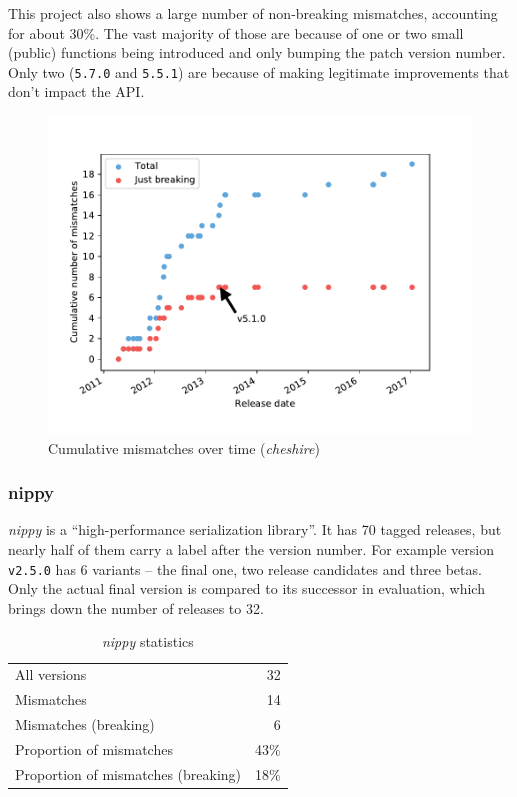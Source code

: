 \documentclass{l4proj}
\newcommand\genericstyle{\lstset{basicstyle=\ttm}}
\newcommand\codeinline[1]{{\genericstyle\lstinline!#1!}}
\begin{document}
This project also shows a large number of non-breaking mismatches,
accounting for about 30\%. The vast majority of those are because of
one or two small (public) functions being introduced and only bumping
the patch version number. Only two (\codeinline{5.7.0} and
\codeinline{5.5.1}) are because of making legitimate improvements that
don't impact the API.

\begin{figure}[H]
\centering
\includegraphics[height=0.4\textheight]{images/evaluation/cheshire_cumulative_mismatches}
\caption{Cumulative mismatches over time (\textit{cheshire})}
\label{CheshireCumulativeMismatches}
\end{figure}

\subsubsection{nippy}

\textit{nippy} is a ``high-performance serialization library''. It has
70 tagged releases, but nearly half of them carry a label after the
version number. For example version \codeinline{v2.5.0} has 6 variants
-- the final one, two release candidates and three betas. Only the
actual final version is compared to its successor in evaluation, which
brings down the number of releases to 32.

\begin{table}
\centering
\caption{\textit{nippy} statistics}
\label{NippyStats}
\begin{tabular}{|lr|}
All versions & 32 \\
Mismatches & 14 \\
Mismatches (breaking) & 6 \\
Proportion of mismatches & 43\% \\
Proportion of mismatches (breaking) & 18\% \\
\end{tabular}
\end{table}
\end{document}
